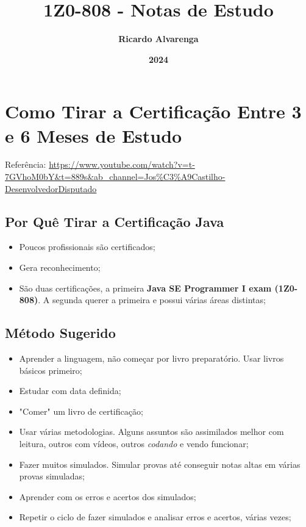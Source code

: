 \documentclass[12pt]{article}
\begin{document}
	
\title{\textbf{{\Huge 1Z0-808 - Notas de Estudo}}} %
\author{\textbf{{\Large Ricardo Alvarenga}}} %
\date{\textbf{{\Large 2024}}} %
\maketitle %
\thispagestyle{empty} %
\newpage

\section*{Como Tirar a Certificação Entre 3 e 6 Meses de Estudo}

Referência: \url{https://www.youtube.com/watch?v=t-7GVhoM0bY&t=889s&ab_channel=Jos%C3%A9Castilho-DesenvolvedorDisputado}

\subsection*{Por Quê Tirar a Certificação Java}

\begin{itemize}
	\item Poucos profissionais são certificados;
	\item Gera reconhecimento;
	\item São duas certificações, a primeira \textbf{Java SE Programmer I exam (1Z0-808)}. A segunda querer a primeira e possui várias áreas distintas;
\end{itemize}

\subsection*{Método Sugerido}

\begin{itemize}
	\item Aprender a linguagem, não começar por livro preparatório. Usar livros básicos primeiro;
	\item Estudar com data definida;
	\item "Comer" um livro de certificação;
	\item Usar várias metodologias. Alguns assuntos são assimilados melhor com leitura, outros com vídeos, outros \textit{codando} e vendo funcionar;
	\item Fazer muitos simulados. Simular provas até conseguir notas altas em várias provas simuladas;
	\item Aprender com os erros e acertos dos simulados;
	\item Repetir o ciclo de fazer simulados e analisar erros e acertos, várias vezes;
\end{itemize}
\end{document}
